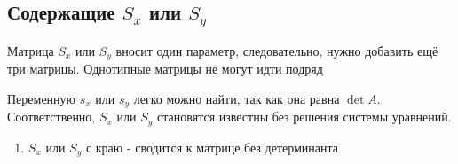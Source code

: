 
\subsection{Содержащие $S_x$ или $S_y$}

Матрица $S_x$ или $S_y$ вносит один параметр, следовательно, нужно добавить ещё три матрицы.
Однотипные матрицы не могут идти подряд

Переменную $s_x$ или $s_y$ легко можно найти, так как она равна $\det A$. Соответственно, $S_x$ или $S_y$ становятся известны без решения системы уравнений.

\begin{enumerate}
	\item $S_x$ или $S_y$ с краю - сводится к матрице без детерминанта

\end{enumerate}